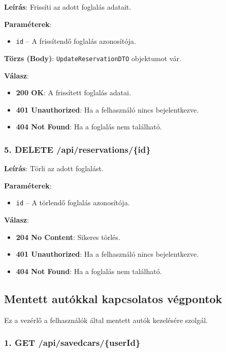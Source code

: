 \documentclass{report}[11pt]
\begin{document}
\textbf{Leírás}:  
Frissíti az adott foglalás adatait.

\textbf{Paraméterek}:  
\begin{itemize}
    \item \texttt{id} – A frissítendő foglalás azonosítója.
\end{itemize}

\textbf{Törzs (Body)}:  
\texttt{UpdateReservationDTO} objektumot vár.

\textbf{Válasz}:  
\begin{itemize}
    \item \textbf{200 OK}: A frissített foglalás adatai.
    \item \textbf{401 Unauthorized}: Ha a felhasználó nincs bejelentkezve.
    \item \textbf{404 Not Found}: Ha a foglalás nem található.
\end{itemize}

\subsubsection{5. DELETE /api/reservations/\{id\}}

\textbf{Leírás}:  
Törli az adott foglalást.

\textbf{Paraméterek}:  
\begin{itemize}
    \item \texttt{id} – A törlendő foglalás azonosítója.
\end{itemize}

\textbf{Válasz}:  
\begin{itemize}
    \item \textbf{204 No Content}: Sikeres törlés.
    \item \textbf{401 Unauthorized}: Ha a felhasználó nincs bejelentkezve.
    \item \textbf{404 Not Found}: Ha a foglalás nem található.
\end{itemize}


\subsection{Mentett autókkal kapcsolatos végpontok}

Ez a vezérlő a felhasználók által mentett autók kezelésére szolgál.

\subsubsection{1. GET /api/savedcars/\{userId\}}
\end{document}
